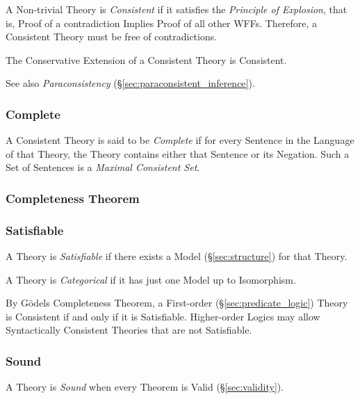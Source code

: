 A Non-trivial Theory is \emph{Consistent} if it satisfies the
\emph{Principle of Explosion}, that is, Proof of a contradiction
Implies Proof of all other WFFs. Therefore, a Consistent Theory must
be free of contradictions.

The Conservative Extension of a Consistent Theory is Consistent.

See also \emph{Paraconsistency} (\S\ref{sec:paraconsistent_inference}).



\subsubsection{Complete}\label{sec:complete_theory}

A Consistent Theory is said to be \emph{Complete} if for every
Sentence in the Language of that Theory, the Theory contains either
that Sentence or its Negation. Such a Set of Sentences is a
\emph{Maximal Consistent Set}.



\subsubsection{Completeness Theorem}\label{sec:completeness}



\subsubsection{Satisfiable}\label{sec:satisfiable_theory}

A Theory is \emph{Satisfiable} if there exists a Model
(\S\ref{sec:structure}) for that Theory.

A Theory is \emph{Categorical} if it has just one Model up to
Isomorphism.


By G\"odels Completeness Theorem, a First-order
(\S\ref{sec:predicate_logic}) Theory is Consistent if and only if it
is Satisfiable. Higher-order Logics may allow Syntactically Consistent
Theories that are not Satisfiable.



\subsubsection{Sound}\label{sec:sound_theory}

A Theory is \emph{Sound} when every Theorem is Valid
(\S\ref{sec:validity}).




